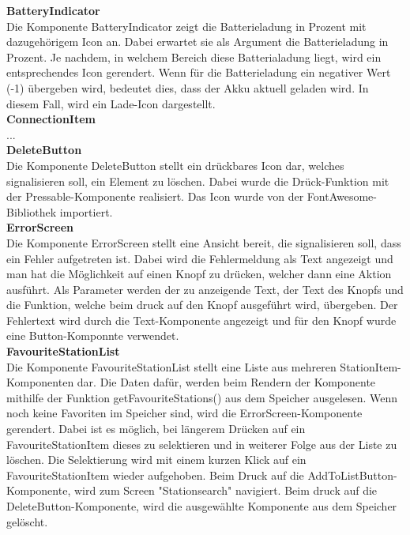 \documentclass[]{article}
\begin{document}
\textbf{BatteryIndicator} \\
Die Komponente BatteryIndicator zeigt die Batterieladung in Prozent mit dazugehörigem Icon an. Dabei erwartet sie als Argument die Batterieladung in Prozent. Je nachdem, in welchem Bereich diese Batterialadung liegt, wird ein entsprechendes Icon gerendert. Wenn für die Batterieladung ein negativer Wert (-1) übergeben wird, bedeutet dies, dass der Akku aktuell geladen wird. In diesem Fall, wird ein Lade-Icon dargestellt. \newline \\
\textbf{ConnectionItem} \\
... \newline \\
\textbf{DeleteButton} \\
Die Komponente DeleteButton stellt ein drückbares Icon dar, welches signalisieren soll, ein Element zu löschen. Dabei wurde die Drück-Funktion mit der Pressable-Komponente realisiert. Das Icon wurde von der FontAwesome-Bibliothek importiert. \newline \\
\textbf{ErrorScreen} \\
Die Komponente ErrorScreen stellt eine Ansicht bereit, die signalisieren soll, dass ein Fehler aufgetreten ist. Dabei wird die Fehlermeldung als Text angezeigt und man hat die Möglichkeit auf einen Knopf zu drücken, welcher dann eine Aktion ausführt. Als Parameter werden der zu anzeigende Text, der Text des Knopfs und die Funktion, welche beim druck auf den Knopf ausgeführt wird, übergeben. Der Fehlertext wird durch die Text-Komponente angezeigt und für den Knopf wurde eine Button-Komponnte verwendet. \newline \\
\textbf{FavouriteStationList} \\
Die Komponente FavouriteStationList stellt eine Liste aus mehreren StationItem-Komponenten dar. Die Daten dafür, werden beim Rendern der Komponente mithilfe der Funktion getFavouriteStations() aus dem Speicher ausgelesen. Wenn noch keine Favoriten im Speicher sind, wird die ErrorScreen-Komponente gerendert. Dabei ist es möglich, bei längerem Drücken auf ein FavouriteStationItem dieses zu selektieren und in weiterer Folge aus der Liste zu löschen. Die Selektierung wird mit einem kurzen Klick auf ein FavouriteStationItem wieder aufgehoben. Beim Druck auf die AddToListButton-Komponente, wird zum Screen "Stationsearch" navigiert. Beim druck auf die DeleteButton-Komponente, wird die ausgewählte Komponente aus dem Speicher gelöscht. \newline \\
\end{document}
